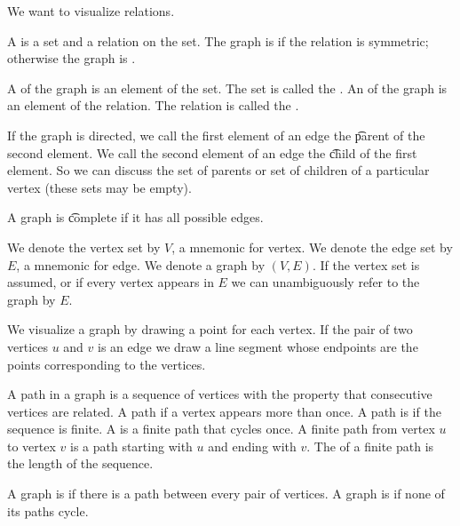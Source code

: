 

We want to visualize relations.


A  is a set and a relation on the set.
The graph is  if the relation is symmetric; otherwise the graph is .

A  of the graph is an element of the set.
The set is called the .  An  of the graph is an element of the relation.
The relation is called the .

If the graph is directed, we call the first element of an edge the \t{parent} of the second element. We call the second element of an edge the \t{child} of the first element. So we can discuss the set of parents or set of children of a particular vertex (these sets may be empty).

A graph is \t{complete} if it has all possible edges.



We denote the vertex set by $V$, a mnemonic for
vertex.
We denote the edge set by $E$, a mnemonic for
edge.
We denote a graph by $(V, E)$.
If the vertex set is assumed, or if every vertex appears in $E$  we can unambiguously refer to the graph by $E$.



We visualize a graph by drawing a point for each vertex.
If the pair of two vertices $u$ and $v$ is an edge we draw a line segment whose endpoints are the points corresponding to the vertices.



A path in a graph is a sequence of vertices with the property that consecutive vertices are related.
A path  if a vertex appears more than once.
A path is  if the sequence is finite.
A  is a finite path that cycles once.
A finite path from vertex $u$ to vertex $v$
is a path starting with $u$ and
ending with $v$.
The  of a finite path is
the length of the sequence.


A graph is 
if there is a path between every pair
of vertices. A graph is
 if none of its
paths cycle.
